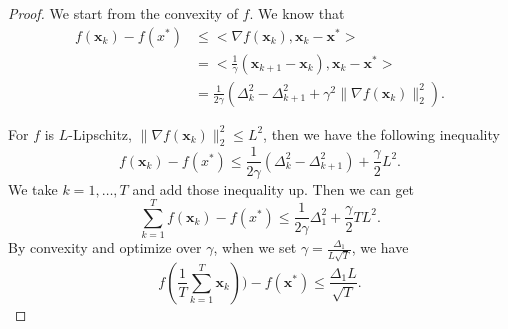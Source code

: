 \documentclass[12pt]{report}
\def\bx{\bm{x}}
\begin{document}
\begin{proof}
We start from the convexity of $f$. We know that
\begin{align*}
f(\bx_k)-f(x^*)&\leq <\nabla f(\bx_k), \bx_k-\bx^*>\\
& =<\frac{1}{\gamma}(\bx_{k+1}-\bx_k), \bx_k-\bx^*>\\
& =\frac{1}{2\gamma}\left( \Delta_k^2-\Delta_{k+1}^2+\gamma^2\|\nabla f(\bx_k)\|_2^2  \right).
\end{align*}

For $f$ is $L$-Lipschitz, $\|\nabla f(\bx_k)\|_2^2\leq L^2$, then we have the following inequality
\begin{equation*}
f(\bx_k)-f(x^*)\leq \frac{1}{2\gamma}(\Delta_k^2-\Delta_{k+1}^2)+\frac{\gamma}{2}L^2.
\end{equation*}
We take $k=1,\dots,T$ and add those inequality up. Then we can get
\begin{equation*}
\sum_{k=1}^T f(\bx_k)-f(x^*)\leq \frac{1}{2\gamma}\Delta_1^2+\frac{\gamma}{2}TL^2.
\end{equation*}
By convexity and optimize over $\gamma$, when we set $\gamma=\frac{\Delta_1}{L\sqrt{T}}$, we have
\begin{equation*}
f(\frac{1}{T}\sum_{k=1}^T \bx_k))-f(\bx^*)\leq \frac{\Delta_1 L}{\sqrt{T}}.
\end{equation*}
\end{proof}
\end{document}
